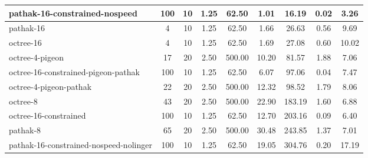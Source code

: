 \begin{sidewaystable}
\begin{longtable}{|l|c|c|c|c|c|c|c|c|}
        pathak-16-constrained-nospeed & {\cellcolor[HTML]{55AA99}} \color[HTML]{F1F1F1} 100 & 10 & 1.25 & {\cellcolor[HTML]{EBF2F0}} \color[HTML]{000000} 62.50 & 1.01 & {\cellcolor[HTML]{EBF2F0}} \color[HTML]{000000} 16.19 & 0.02 & 3.26 \\ \hline
        pathak-16 & {\cellcolor[HTML]{EBF2F0}} \color[HTML]{000000} 4 & 10 & 1.25 & {\cellcolor[HTML]{EBF2F0}} \color[HTML]{000000} 62.50 & 1.66 & {\cellcolor[HTML]{EBF2F0}} \color[HTML]{000000} 26.63 & 0.56 & 9.69 \\ \hline
        octree-16 & {\cellcolor[HTML]{EBF2F0}} \color[HTML]{000000} 4 & 10 & 1.25 & {\cellcolor[HTML]{EBF2F0}} \color[HTML]{000000} 62.50 & 1.69 & {\cellcolor[HTML]{EBF2F0}} \color[HTML]{000000} 27.08 & 0.60 & 10.02 \\ \hline
        octree-4-pigeon & {\cellcolor[HTML]{EBF2F0}} \color[HTML]{000000} 17 & 20 & 2.50 & {\cellcolor[HTML]{DBEBE7}} \color[HTML]{000000} 500.00 & 10.20 & {\cellcolor[HTML]{E9F1EF}} \color[HTML]{000000} 81.57 & 1.88 & 7.06 \\ \hline
        octree-16-constrained-pigeon-pathak & {\cellcolor[HTML]{55AA99}} \color[HTML]{F1F1F1} 100 & 10 & 1.25 & {\cellcolor[HTML]{EBF2F0}} \color[HTML]{000000} 62.50 & 6.07 & {\cellcolor[HTML]{E0EDEA}} \color[HTML]{000000} 97.06 & 0.04 & 7.47 \\ \hline
        octree-4-pigeon-pathak & {\cellcolor[HTML]{EBF2F0}} \color[HTML]{000000} 22 & 20 & 2.50 & {\cellcolor[HTML]{DBEBE7}} \color[HTML]{000000} 500.00 & 12.32 & {\cellcolor[HTML]{E0EDEA}} \color[HTML]{000000} 98.52 & 1.79 & 8.06 \\ \hline
        octree-8 & {\cellcolor[HTML]{EBF2F0}} \color[HTML]{000000} 43 & 20 & 2.50 & {\cellcolor[HTML]{DBEBE7}} \color[HTML]{000000} 500.00 & 22.90 & {\cellcolor[HTML]{B4D8D0}} \color[HTML]{000000} 183.19 & 1.60 & 6.88 \\ \hline
        octree-16-constrained & {\cellcolor[HTML]{55AA99}} \color[HTML]{F1F1F1} 100 & 10 & 1.25 & {\cellcolor[HTML]{EBF2F0}} \color[HTML]{000000} 62.50 & 12.70 & {\cellcolor[HTML]{AAD3CA}} \color[HTML]{000000} 203.16 & 0.09 & 6.40 \\ \hline
        pathak-8 & {\cellcolor[HTML]{EBF2F0}} \color[HTML]{000000} 65 & 20 & 2.50 & {\cellcolor[HTML]{DBEBE7}} \color[HTML]{000000} 500.00 & 30.48 & {\cellcolor[HTML]{95C9BE}} \color[HTML]{000000} 243.85 & 1.37 & 7.01 \\ \hline
        pathak-16-constrained-nospeed-nolinger & {\cellcolor[HTML]{55AA99}} \color[HTML]{F1F1F1} 100 & 10 & 1.25 & {\cellcolor[HTML]{EBF2F0}} \color[HTML]{000000} 62.50 & 19.05 & {\cellcolor[HTML]{75BAAC}} \color[HTML]{000000} 304.76 & 0.20 & 17.19 \\ \hline

\end{longtable}
\end{sidewaystable}
